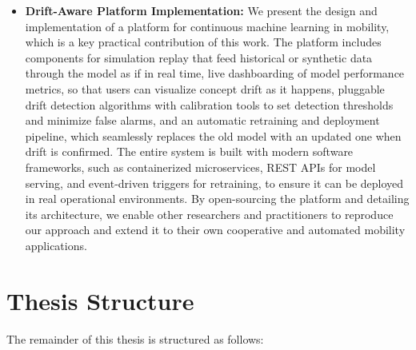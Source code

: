 \begin{itemize}
    \item \textbf{Drift-Aware Platform Implementation:} We present the design and implementation of a platform for continuous machine learning in mobility, which is a key practical contribution of this work.
        The platform includes components for simulation replay that feed historical or synthetic data through the model as if in real time, live dashboarding of model performance metrics, so that users can visualize concept drift as it happens, pluggable drift detection algorithms with calibration tools to set detection thresholds and minimize false alarms, and an automatic retraining and deployment pipeline, which seamlessly replaces the old model with an updated one when drift is confirmed.
        The entire system is built with modern software frameworks, such as containerized microservices, REST APIs for model serving, and event-driven triggers for retraining, to ensure it can be deployed in real operational environments.
        By open-sourcing the platform and detailing its architecture, we enable other researchers and practitioners to reproduce our approach and extend it to their own cooperative and automated mobility applications.

\end{itemize}

\section{Thesis Structure}

The remainder of this thesis is structured as follows:

